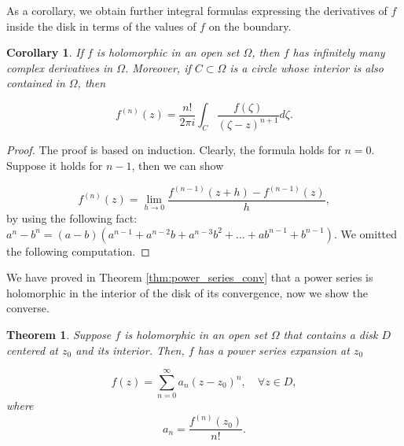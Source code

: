 \documentclass{article}
\newtheorem{theorem}{Theorem}
\newtheorem{corollary}{Corollary}
\begin{document}
As a corollary, we obtain further integral formulas expressing the derivatives of $f$ inside the disk in terms of the values of $f$ on the boundary.

\begin{corollary}
If $f$ is holomorphic in an open set $\Omega$, then $f$ has infinitely many complex derivatives in $\Omega$. Moreover, if $C\subset\Omega$ is a circle whose interior is also contained in $\Omega$, then 

\begin{equation*}
f^{(n)}(z)=\frac{n!}{2\pi i}\int_C\frac{f(\zeta)}{(\zeta-z)^{n+1}}d\zeta.
\end{equation*}
\end{corollary}

\begin{proof}
The proof is based on induction. Clearly, the formula holds for $n=0$. Suppose it holds for $n-1$, then we can show

\begin{equation*}
f^{(n)}(z)=\lim_{h\rightarrow0}\frac{f^{(n-1)}(z+h)-f^{(n-1)}(z)}{h},
\end{equation*}
by using the following fact: $a^n-b^n=(a-b)(a^{n-1}+a^{n-2}b+a^{n-3}b^2+...+ab^{n-1}+b^{n-1})$. We omitted the following computation.
\end{proof}

We have proved in Theorem \ref{thm:power_series_conv} that a power series is holomorphic in the interior of the disk of its convergence, now we show the converse.

\begin{theorem} \label{thm:holomorphic_power_series}
Suppose $f$ is holomorphic in an open set $\Omega$ that contains a disk $D$ centered at $z_0$ and its interior. Then, $f$ has a power series expansion at $z_0$

\begin{equation*}
f(z)=\sum_{n=0}^\infty a_n(z-z_0)^n, \quad \forall z\in D,
\end{equation*}
where
\begin{equation*}
a_n=\frac{f^{(n)}(z_0)}{n!}.
\end{equation*}
\end{theorem}
\end{document}
